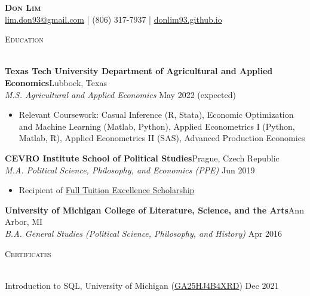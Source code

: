\documentclass[a4paper,11pt]{article}
\newcommand{\lineunder} {
    \vspace*{-8pt} \\
    \hspace*{-18pt} \hrulefill \\
}
\newcommand{\header} [1] {
    {\hspace*{-18pt}\vspace*{6pt} \textsc{\large{#1}}}
    \vspace*{-6pt} \lineunder
}
\begin{document}
\vspace*{-40pt}


\vspace*{-10pt}
\begin{center}
    {\Huge \scshape \textbf{{Don Lim}}}\\
    \href{mailto:lim.don93@gmail.com}{lim.don93@gmail.com} | (806) 317-7937 | \href{https://donlim93.github.io/}{donlim93.github.io} \\
\end{center}

\header{Education}
\vspace{1mm}

\textbf{Texas Tech University Department of Agricultural and Applied Economics}\hfill Lubbock, Texas\\
\textit{M.S. Agricultural and Applied Economics} \hfill May 2022 (expected)\\
\begin{itemize}[noitemsep,nolistsep]
    \item Relevant Coursework: Casual Inference (R, Stata), Economic Optimization and Machine Learning (Matlab, Python), Applied Econometrics I (Python, Matlab, R), Applied Econometrics II (SAS), Advanced Production Economics
\end{itemize}
\vspace{1mm}
\textbf{CEVRO Institute School of Political Studies}\hfill Prague, Czech Republic\\
\textit{M.A. Political Science, Philosophy, and Economics (PPE)} \hfill Jun 2019\\
\begin{itemize}[noitemsep,nolistsep]
    \item Recipient of \href{http://www.cevroinstitut.cz/en/article/scholarships/}{Full Tuition Excellence Scholarship}
\end{itemize}
\vspace{1mm}
\textbf{University of Michigan College of Literature, Science, and the Arts}\hfill Ann Arbor, MI\\
\textit{B.A. General Studies (Political Science, Philosophy, and History)} \hfill Apr 2016\\
\vspace{2mm}

\header{Certificates}
\vspace{1mm}

Introduction to SQL, University of Michigan (\href{https://coursera.org/verify/GA25HJ4B4XRD}{GA25HJ4B4XRD}) \hfill Dec 2021
\vspace{2mm}
\end{document}
